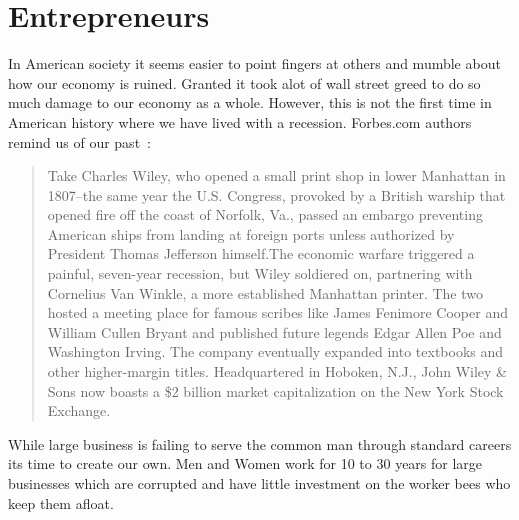 \documentclass[pdftex,10pt,a4paper]{report}
\begin{document}
\section{Entrepreneurs}
\begin{doublespace}
In  American society it seems easier to point fingers at others and mumble about how our economy is ruined. Granted it took alot of wall street greed to do so much damage to our economy as a whole. However, this is not the first time in American history where we have lived with a recession. Forbes.com authors remind us of our past~\cite{Linder:2011}: 
\end{doublespace} 
\begin{quote}
Take Charles Wiley, who opened a small print shop in lower Manhattan in 1807--the same year the U.S. Congress, provoked by a British warship that opened fire off the coast of Norfolk, Va., passed an embargo preventing American ships from landing at foreign ports unless authorized by President Thomas Jefferson himself.The economic warfare triggered a painful, seven-year recession, but Wiley soldiered on, partnering with Cornelius Van Winkle, a more established Manhattan printer. The two hosted a meeting place for famous scribes like James Fenimore Cooper and William Cullen Bryant and published future legends Edgar Allen Poe and Washington Irving. The company eventually expanded into textbooks and other higher-margin titles. Headquartered in Hoboken, N.J., John Wiley \& Sons now boasts a \$2 billion market capitalization on the New York Stock Exchange.
\end{quote}
\begin{doublespace}
While large business is failing to serve the common man through standard careers its time to create our own. Men and Women work for 10 to 30 years for large businesses which are corrupted and have little investment on the worker bees who keep them afloat.
\end{doublespace}
\clearpage
    \nocite{*}
    
    
\end{document}
